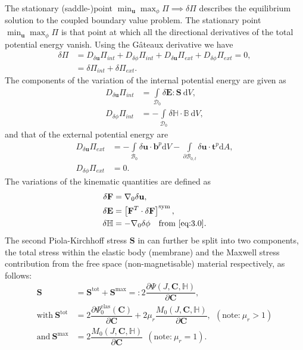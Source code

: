 \documentclass[11pt,a4paper,final]{article}
\begin{document}
The stationary (saddle-)point $\min_{\mathbf{u}} \max_{\phi} \Pi \implies \delta \Pi$ describes the equilibrium solution to the coupled boundary value problem. The stationary point $\min_{\mathbf{u}} \max_{\phi} \Pi$ is that point at which all the directional derivatives of the total potential energy vanish. Using the G\^ateaux derivative we have
\begin{align}
\delta \Pi &= D_{\delta \mathbf{u}} \Pi_{int} + D_{\delta \phi} \Pi_{int} + D_{\delta \mathbf{u}} \Pi_{ext} + D_{\delta \phi} \Pi_{ext} = 0, \label{eq:3.25} \\
&= \delta \Pi_{int} + \delta \Pi_{ext}. \nonumber
\end{align}
The components of the variation of the internal potential energy are given as \cite{Saxena2015}
\begin{align}
D_{\delta \mathbf{u}} \Pi_{int} &= \int\limits_{\mathcal{D}_0} \delta \mathbf{E} : \mathbf{S} \ \mathrm{d}V, \label{eq:3.26.1}\\
D_{\delta \phi} \Pi_{int} &= -\int\limits_{\mathcal{D}_0} \delta \mathbb{H} \cdot \mathbb{B} \ \mathrm{d}V,
\label{eq:3.26.2}
\end{align}
and that of the external potential energy are
\begin{align}
D_{\delta \mathbf{u}} \Pi_{ext} &= -\int\limits_{\mathcal{B}_0} \delta \mathbf{u} \cdot \mathbf{b}^p \mathrm{d}V - \int\limits_{\partial \mathcal{B}_{0,t}} \delta \mathbf{u} \cdot \mathbf{t}^p \mathrm{d}A, \label{eq:3.27.1}\\
D_{\delta \phi} \Pi_{ext} &= 0.
\label{eq:3.27.2}
\end{align}
The variations of the kinematic quantities are defined as 
\begin{align}
\delta \mathbf{F} &= \nabla_0 \delta \mathbf{u}, \\
\delta \mathbf{E} &= \left[ \mathbf{F}^T \cdot \delta \mathbf{F} \right]^{\text{sym}}, \\ 
\delta \mathbb{H} &= -\nabla_0 \delta \phi \ \ \text{ from \Cref{eq:3.0}}.
\label{eq:3.28}
\end{align}
The second Piola-Kirchhoff stress $\mathbf{S}$ in  can further be split into two components, the total stress within the elastic body (membrane) and the Maxwell stress contribution from the free space (non-magnetisable) material respectively, as follows:
\begin{align}
\mathbf{S} &= \mathbf{S}^{\text{tot}} + \mathbf{S}^{\text{max}} =: 2 \dfrac{\partial \Psi (J, \mathbf{C}, \mathbb{H})}{\partial \mathbf{C}}, \\
\text{with} \ \mathbf{S}^{\text{tot}} &= 2 \dfrac{\partial \Psi_0^{\text{elas}} (\mathbf{C})}{\partial \mathbf{C}} + 2 \mu_r \dfrac{M_0 (J, \mathbf{C}, \mathbb{H})}{\partial \mathbf{C}}, \ \ (\text{note:} \ \mu_r > 1)\\
\text{and} \ \mathbf{S}^{\text{max}} &= 2 \dfrac{M_0 (J, \mathbf{C}, \mathbb{H})}{\partial \mathbf{C}}  \ \ (\text{note:} \ \mu_r = 1).
\end{align}
\end{document}
